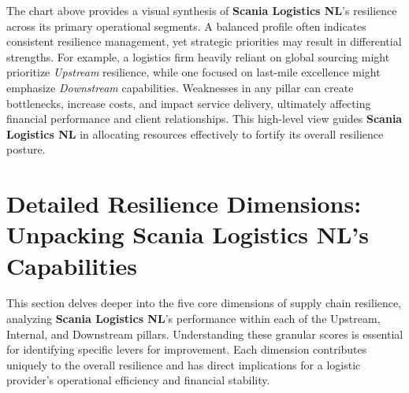 \documentclass[
  oneside,
  open=any,
  fontsize=11pt]{scrbook}
\begin{document}
The chart above provides a visual synthesis of \textbf{Scania Logistics
NL}'s resilience across its primary operational segments. A balanced
profile often indicates consistent resilience management, yet strategic
priorities may result in differential strengths. For example, a
logistics firm heavily reliant on global sourcing might prioritize
\emph{Upstream} resilience, while one focused on last-mile excellence
might emphasize \emph{Downstream} capabilities. Weaknesses in any pillar
can create bottlenecks, increase costs, and impact service delivery,
ultimately affecting financial performance and client relationships.
This high-level view guides \textbf{Scania Logistics NL} in allocating
resources effectively to fortify its overall resilience posture.

\chapter{Detailed Resilience Dimensions: Unpacking Scania Logistics NL's
Capabilities}\label{detailed-resilience-dimensions-unpacking-scania-logistics-nls-capabilities}

This section delves deeper into the five core dimensions of supply chain
resilience, analyzing \textbf{Scania Logistics NL}'s performance within
each of the Upstream, Internal, and Downstream pillars. Understanding
these granular scores is essential for identifying specific levers for
improvement. Each dimension contributes uniquely to the overall
resilience and has direct implications for a logistic provider's
operational efficiency and financial stability.
\end{document}
